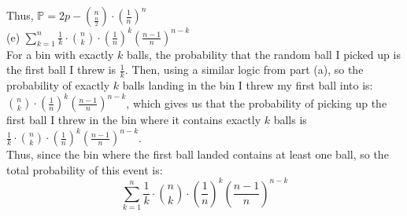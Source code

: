\documentclass{article}
\begin{document}
Thus, $\mathbb{P} =
2p - \binom{n}{\frac{n}{2}} \cdot (\frac{1}{n})^n$ \\[.5cm]
{\color{red} (e) $\sum\limits_{k=1}^n \frac{1}{k}\cdot\binom{n}{k}\cdot(\frac{1}{n})^{k}(\frac{n-1}{n})^{n-k}$ } \\

For a bin with exactly $k$ balls, the probability that the random ball I picked up is the first ball I threw is $\frac{1}{k}$. Then, using a similar logic from part (a), so the probability of exactly $k$ balls landing in the bin I threw my first ball into is:
$\binom{n}{k}\cdot(\frac{1}{n})^{k}(\frac{n-1}{n})^{n-k}$, which gives us that the probability of picking up the first ball I threw in the bin where it contains exactly $k$ balls is
$\frac{1}{k}\cdot\binom{n}{k}\cdot(\frac{1}{n})^{k}(\frac{n-1}{n})^{n-k}$. \\

Thus, since the bin where the first ball landed contains at least one ball, so the total probability of this event is:
$$\sum\limits_{k=1}^n \frac{1}{k}\cdot\binom{n}{k}\cdot(\frac{1}{n})^{k}(\frac{n-1}{n})^{n-k}$$
\end{document}
